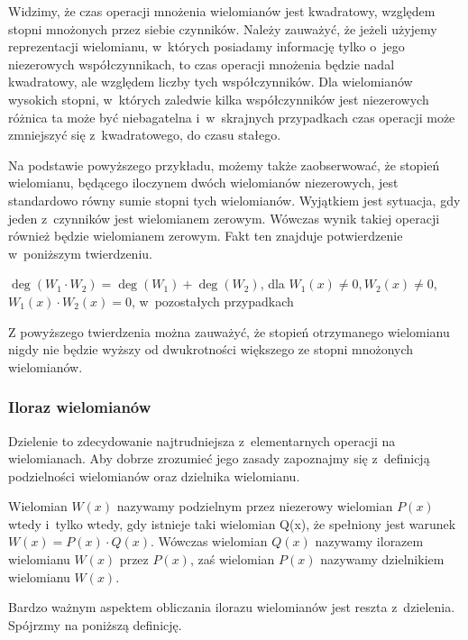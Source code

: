 Widzimy, że czas operacji mnożenia wielomianów jest kwadratowy, względem stopni mnożonych przez siebie czynników. Należy zauważyć, że jeżeli użyjemy reprezentacji wielomianu, w~których posiadamy informację tylko o~jego niezerowych współczynnikach, to czas operacji mnożenia będzie nadal kwadratowy, ale względem liczby tych współczynników. Dla wielomianów wysokich stopni, w~których zaledwie kilka współczynników jest niezerowych różnica ta może być niebagatelna i~w~skrajnych przypadkach czas operacji może zmniejszyć się z~kwadratowego, do czasu stałego.

Na podstawie powyższego przykładu, możemy także zaobserwować, że stopień wielomianu, będącego iloczynem dwóch wielomianów niezerowych, jest standardowo równy sumie stopni tych wielomianów. Wyjątkiem jest sytuacja, gdy jeden z~czynników jest wielomianem zerowym. Wówczas wynik takiej operacji również będzie wielomianem zerowym. Fakt ten znajduje potwierdzenie w~poniższym twierdzeniu.

\begin{theorem}
	$ $\\
	$\deg(W_1 \cdot W_2) = \deg(W_1) + \deg(W_2)$, dla $W_1(x) \neq 0, W_2(x) \neq 0$, $W_1(x) \cdot W_2(x) = 0$, w~pozostałych przypadkach
\end{theorem}

Z powyższego twierdzenia można zauważyć, że stopień otrzymanego wielomianu nigdy nie będzie wyższy od dwukrotności większego ze stopni mnożonych wielomianów.

\subsubsection{Iloraz wielomianów}

Dzielenie to zdecydowanie najtrudniejsza z~elementarnych operacji na wielomianach. Aby dobrze zrozumieć jego zasady zapoznajmy się z~definicją podzielności wielomianów oraz dzielnika wielomianu.

\begin{definition}
	$ $\\
	Wielomian $W(x)$ nazywamy podzielnym przez niezerowy wielomian $P(x)$ wtedy i~tylko wtedy, gdy istnieje taki wielomian Q(x), że spełniony jest warunek $W(x) = P(x) \cdot Q(x)$. Wówczas wielomian $Q(x)$ nazywamy ilorazem wielomianu $W(x)$ przez $P(x)$, zaś wielomian $P(x)$ nazywamy dzielnikiem wielomianu $W(x)$.
\end{definition}

Bardzo ważnym aspektem obliczania ilorazu wielomianów jest reszta z~dzielenia. Spójrzmy na poniższą definicję.


